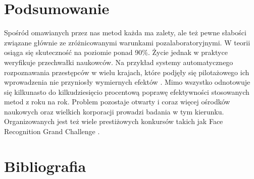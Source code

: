 \documentclass[11pt,a4paper]{article}
\begin{document}
\section{Podsumowanie}

Spośród omawianych przez nas metod każda ma zalety, ale też pewne słabości związane głównie ze zróżnicowanymi warunkami pozalaboratoryjnymi. W teorii osiąga się skuteczność na poziomie ponad 90\%. Życie jednak w praktyce weryfikuje przechwałki naukowców. Na przykład systemy automatycznego rozpoznawania przestępców w wielu krajach, które podjęły się pilotażowego ich wprowadzenia nie przyniosły wymiernych efektów \cite{SMIA002}. Mimo wszystko odnotowuje się kilkunasto do kilkudziesięcio procentową poprawę efektywności stosowanych metod z roku na rok. Problem pozostaje otwarty i coraz więcej ośrodków naukowych oraz wielkich korporacji prowadzi badania w tym kierunku. Organizowanych jest też wiele prestiżowych konkursów takich jak Face Recognition Grand Challenge \cite{FRGC001}.

\section{Bibliografia}



\end{document}
